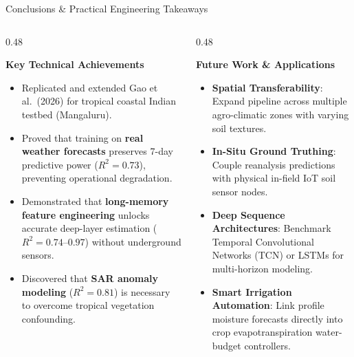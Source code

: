 \documentclass[aspectratio=169, 10pt]{beamer}
\begin{document}
\begin{frame}{Conclusions \& Practical Engineering Takeaways}
    \begin{columns}[t]
        \begin{column}{0.48\textwidth}
            \begin{block}{\textbf{Key Technical Achievements}}
                \footnotesize
                \begin{itemize}
                    \item Replicated and extended Gao et al.\ (2026) for tropical coastal Indian testbed (Mangaluru).
                    \item Proved that training on \textbf{real weather forecasts} preserves 7-day predictive power ($R^2 = 0.73$), preventing operational degradation.
                    \item Demonstrated that \textbf{long-memory feature engineering} unlocks accurate deep-layer estimation ($R^2 = 0.74\text{--}0.97$) without underground sensors.
                    \item Discovered that \textbf{SAR anomaly modeling} ($R^2 = 0.81$) is necessary to overcome tropical vegetation confounding.
                \end{itemize}
            \end{block}
        \end{column}
        \begin{column}{0.48\textwidth}
            \begin{exampleblock}{\textbf{Future Work \& Applications}}
                \footnotesize
                \begin{itemize}
                    \item \textbf{Spatial Transferability}: Expand pipeline across multiple agro-climatic zones with varying soil textures.
                    \item \textbf{In-Situ Ground Truthing}: Couple reanalysis predictions with physical in-field IoT soil sensor nodes.
                    \item \textbf{Deep Sequence Architectures}: Benchmark Temporal Convolutional Networks (TCN) or LSTMs for multi-horizon modeling.
                    \item \textbf{Smart Irrigation Automation}: Link profile moisture forecasts directly into crop evapotranspiration water-budget controllers.
                \end{itemize}
            \end{exampleblock}
        \end{column}
    \end{columns}
\end{frame}
\end{document}
